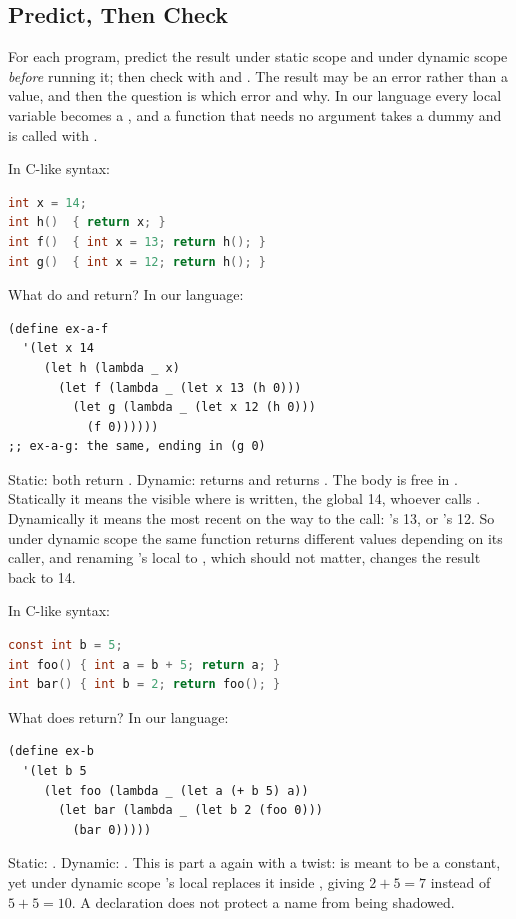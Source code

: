\subsection{Predict, Then Check}

For each program, predict the result under static scope and under dynamic scope \emph{before} running it; then check with  and . The result may be an error rather than a value, and then the question is which error and why. In our language every local variable becomes a , and a function that needs no argument takes a dummy \code{\_} and is called with .

\begin{exercise}
In C-like syntax:
\begin{lstlisting}[language=C]
int x = 14;
int h()  { return x; }
int f()  { int x = 13; return h(); }
int g()  { int x = 12; return h(); }
\end{lstlisting}
What do  and  return? In our language:
\begin{lstlisting}
(define ex-a-f
  '(let x 14
     (let h (lambda _ x)
       (let f (lambda _ (let x 13 (h 0)))
         (let g (lambda _ (let x 12 (h 0)))
           (f 0))))))
;; ex-a-g: the same, ending in (g 0)
\end{lstlisting}
\end{exercise}
\begin{solution}
Static: both return . Dynamic:  returns  and  returns . The body  is free in . Statically it means the  visible where  is written, the global 14, whoever calls . Dynamically it means the most recent  on the way to the call: 's 13, or 's 12. So under dynamic scope the same function returns different values depending on its caller, and renaming 's local  to , which should not matter, changes the result back to 14.
\end{solution}

\begin{exercise}
In C-like syntax:
\begin{lstlisting}[language=C]
const int b = 5;
int foo() { int a = b + 5; return a; }
int bar() { int b = 2; return foo(); }
\end{lstlisting}
What does  return? In our language:
\begin{lstlisting}
(define ex-b
  '(let b 5
     (let foo (lambda _ (let a (+ b 5) a))
       (let bar (lambda _ (let b 2 (foo 0)))
         (bar 0)))))
\end{lstlisting}
\end{exercise}
\begin{solution}
Static: . Dynamic: . This is part a again with a twist:  is meant to be a constant, yet under dynamic scope 's local  replaces it inside , giving $2+5=7$ instead of $5+5=10$. A  declaration does not protect a name from being shadowed.
\end{solution}

